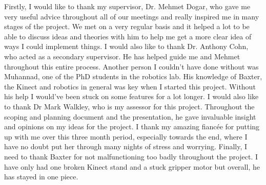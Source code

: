 Firstly, I would like to thank my supervisor, Dr. Mehmet Dogar, who gave me very useful advice throughout all of our meetings and really inspired me in many stages of the project. We met on a very regular basis and it helped a lot to be able to discuss ideas and theories with him to help me get a more clear idea of ways I could implement things. I would also like to thank Dr. Anthony Cohn, who acted as a secondary supervisor. He has helped guide me and Mehmet throughout this entire process. Another person I couldn't have done without was Muhannad, one of the PhD students in the robotics lab. His knowledge of Baxter, the Kinect and robotics in general was key when I started this project. Without his help I would've been stuck on some features for a lot longer.
\newline\newline
I would also like to thank Dr Mark Walkley, who is my assessor for this project. Throughout the scoping and planning document and the presentation, he gave invaluable insight and opinions on my ideas for the project.
\newline\newline
I thank my amazing fianc\'{e}e for putting up with me over this three month period, especially towards the end, where I have no doubt put her through many nights of stress and worrying.
\newline\newline
Finally, I need to thank Baxter for not malfunctioning too badly throughout the project. I have only had one broken Kinect stand and a stuck gripper motor but overall, he has stayed in one piece.